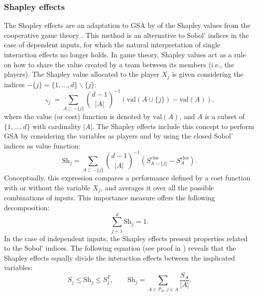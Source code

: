 \subsubsection{Shapley effects}
The Shapley effects are an adaptation to GSA by \citet{owen_2014_shapley} of the Shapley values from the cooperative game theory \citep{shapley_1953}. 
This method is an alternative to Sobol' indices in the case of dependent inputs, for which the natural interpretation of single interaction effects no longer holds. 
In game theory, Shapley values act as a rule on how to share the value created by a team between its members (i.e., the players). 
The Shapley value allocated to the player $X_j$ is given considering the indices $-\{j\}= \{1, \dots, d\} \backslash \{j\}$:
\begin{equation}
    \varsigma_j = \sum_{A \subset -\{j\}} \binom{d-1}{|A|}^{-1} \left(\mathrm{val}(A \cup \{j\}) - \mathrm{val}(A)\right),
\end{equation}
where the value (or cost) function is denoted by $\mathrm{val}(A)$, and $A$ is a subset of $\{1, \dots, d\}$ with cardinality $|A|$. 
The Shapley effects include this concept to perform GSA by considering the variables as players and by using the closed Sobol' indices as value function: 
\begin{equation}
    \label{eq:shapley_effects}
    \mbox{Sh}_j = \sum_{A \subset -\{j\}} \binom{d-1}{|A|}^{-1} \left(S_{A\, \cup \{j\}}^{\mathrm{clos}} - S_A^{\mathrm{clos}}\right).
\end{equation}
Conceptually, this expression compares a performance defined by a cost function with or without the variable $X_j$, and averages it over all the possible combinations of inputs. 
This importance measure offers the following decomposition: 
\begin{equation}
    \sum_{j=1}^{d} \mbox{Sh}_j = 1.
\end{equation}
In the case of independent inputs, the Shapley effects present properties related to the Sobol' indices. 
The following equation (see proof in \citealp{owen_2014_shapley}) reveals that the Shapley effects equally divide the interaction effects between the implicated variables:
\begin{equation}
    S_j \leq \mbox{Sh}_j \leq S_j^T, \qquad \mbox{Sh}_j = \sum_{A \in \mathcal{P}_d, \, j \in A} \frac{S_A}{|A|}.
\end{equation}   

